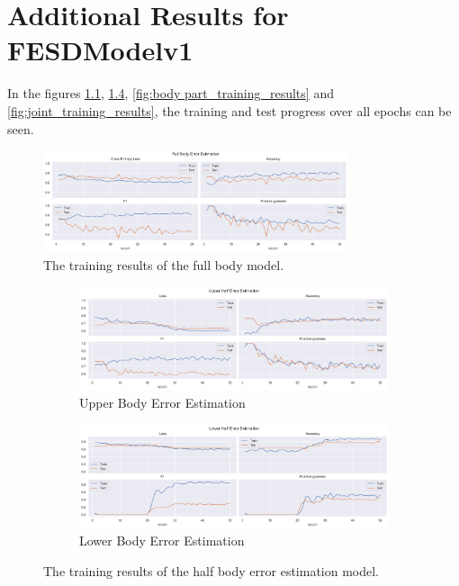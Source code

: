 \chapter{Additional Results for FESDModelv1}

In the figures \ref{fig:full_body_training_results_v1}, \ref{fig:half_body_training_results}, \ref{fig:body part_training_results} and \ref{fig:joint_training_results}, the training and test progress over all epochs can be seen.

\begin{figure}[htbp]
  \centering
  \includegraphics[width=0.8\textwidth]{figures/Results/v1/fb/FullBody_ErrorEstimation.png}
  \caption[Full Body model training results]{The training results of the full body model.}
  \label{fig:full_body_training_results_v1}
\end{figure}

\begin{figure}[htbp]
  \centering
  \begin{subfigure}[b]{0.8\textwidth}
      \centering
      \includegraphics[width=\textwidth]{figures/Results/v1/hb/UpperBody_ErrorEstimation.png}
      \caption{Upper Body Error Estimation}
      \label{fig:uh_ee}
  \end{subfigure}
  \hfill
  \begin{subfigure}[b]{0.8\textwidth}
      \centering
      \includegraphics[width=\textwidth]{figures/Results/v1/hb/LowerBody_ErrorEstimation.png}
      \caption{Lower Body Error Estimation}
      \label{fig:lh_ee}
  \end{subfigure}
  \caption[Half Body model training results]{The training results of the half body error estimation model.}
     \label{fig:half_body_training_results}
\end{figure}

